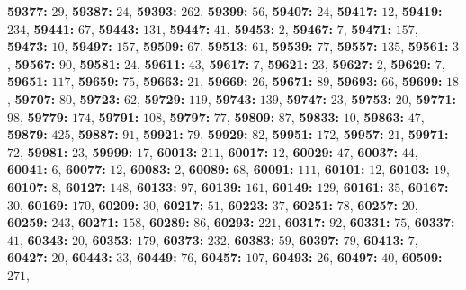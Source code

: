 \textsf{\bfseries 59377:} $29$, \textsf{\bfseries 59387:} $24$, \textsf{\bfseries 59393:} $262$, \textsf{\bfseries 59399:} $56$, \textsf{\bfseries 59407:} $24$, \textsf{\bfseries 59417:} $12$, \textsf{\bfseries 59419:} $234$, \textsf{\bfseries 59441:} $67$, \textsf{\bfseries 59443:} $131$, \textsf{\bfseries 59447:} $41$, \textsf{\bfseries 59453:} $2$, \textsf{\bfseries 59467:} $7$, \textsf{\bfseries 59471:} $157$, \textsf{\bfseries 59473:} $10$, \textsf{\bfseries 59497:} $157$, \textsf{\bfseries 59509:} $67$, \textsf{\bfseries 59513:} $61$, \textsf{\bfseries 59539:} $77$, \textsf{\bfseries 59557:} $135$, \textsf{\bfseries 59561:} $3$, \textsf{\bfseries 59567:} $90$, \textsf{\bfseries 59581:} $24$, \textsf{\bfseries 59611:} $43$, \textsf{\bfseries 59617:} $7$, \textsf{\bfseries 59621:} $23$, \textsf{\bfseries 59627:} $2$, \textsf{\bfseries 59629:} $7$, \textsf{\bfseries 59651:} $117$, \textsf{\bfseries 59659:} $75$, \textsf{\bfseries 59663:} $21$, \textsf{\bfseries 59669:} $26$, \textsf{\bfseries 59671:} $89$, \textsf{\bfseries 59693:} $66$, \textsf{\bfseries 59699:} $18$, \textsf{\bfseries 59707:} $80$, \textsf{\bfseries 59723:} $62$, \textsf{\bfseries 59729:} $119$, \textsf{\bfseries 59743:} $139$, \textsf{\bfseries 59747:} $23$, \textsf{\bfseries 59753:} $20$, \textsf{\bfseries 59771:} $98$, \textsf{\bfseries 59779:} $174$, \textsf{\bfseries 59791:} $108$, \textsf{\bfseries 59797:} $77$, \textsf{\bfseries 59809:} $87$, \textsf{\bfseries 59833:} $10$, \textsf{\bfseries 59863:} $47$, \textsf{\bfseries 59879:} $425$, \textsf{\bfseries 59887:} $91$, \textsf{\bfseries 59921:} $79$, \textsf{\bfseries 59929:} $82$, \textsf{\bfseries 59951:} $172$, \textsf{\bfseries 59957:} $21$, \textsf{\bfseries 59971:} $72$, \textsf{\bfseries 59981:} $23$, \textsf{\bfseries 59999:} $17$, \textsf{\bfseries 60013:} $211$, \textsf{\bfseries 60017:} $12$, \textsf{\bfseries 60029:} $47$, \textsf{\bfseries 60037:} $44$, \textsf{\bfseries 60041:} $6$, \textsf{\bfseries 60077:} $12$, \textsf{\bfseries 60083:} $2$, \textsf{\bfseries 60089:} $68$, \textsf{\bfseries 60091:} $111$, \textsf{\bfseries 60101:} $12$, \textsf{\bfseries 60103:} $19$, \textsf{\bfseries 60107:} $8$, \textsf{\bfseries 60127:} $148$, \textsf{\bfseries 60133:} $97$, \textsf{\bfseries 60139:} $161$, \textsf{\bfseries 60149:} $129$, \textsf{\bfseries 60161:} $35$, \textsf{\bfseries 60167:} $30$, \textsf{\bfseries 60169:} $170$, \textsf{\bfseries 60209:} $30$, \textsf{\bfseries 60217:} $51$, \textsf{\bfseries 60223:} $37$, \textsf{\bfseries 60251:} $78$, \textsf{\bfseries 60257:} $20$, \textsf{\bfseries 60259:} $243$, \textsf{\bfseries 60271:} $158$, \textsf{\bfseries 60289:} $86$, \textsf{\bfseries 60293:} $221$, \textsf{\bfseries 60317:} $92$, \textsf{\bfseries 60331:} $75$, \textsf{\bfseries 60337:} $41$, \textsf{\bfseries 60343:} $20$, \textsf{\bfseries 60353:} $179$, \textsf{\bfseries 60373:} $232$, \textsf{\bfseries 60383:} $59$, \textsf{\bfseries 60397:} $79$, \textsf{\bfseries 60413:} $7$, \textsf{\bfseries 60427:} $20$, \textsf{\bfseries 60443:} $33$, \textsf{\bfseries 60449:} $76$, \textsf{\bfseries 60457:} $107$, \textsf{\bfseries 60493:} $26$, \textsf{\bfseries 60497:} $40$, \textsf{\bfseries 60509:} $271$, 
